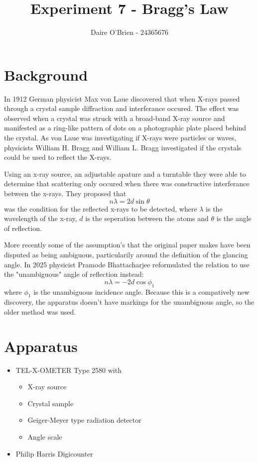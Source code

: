 \documentclass{article}
\title{Experiment 7 - Bragg's Law}
\author{Daire O'Brien - 24365676}
\begin{document}
    \maketitle
    \section{Background}
        In 1912 German physicist Max von Laue discovered that when X-rays passed through a crystal sample diffraction and interferance occured. The effect was observed when a crystal was struck with a broad-band X-ray source and manifested as a ring-like pattern of dots on a photographic plate placed behind the crystal.  As von Laue was investigating if X-rays were particles or waves, physicists William H. Bragg and William L. Bragg investigated if the crystals could be used to reflect the X-rays. \par
        Using an x-ray source, an adjustable apature and a turntable they were able to determine that scattering only occured when there was constructive interferance between the x-rays. They proposed that 
            \begin{equation}
                n \lambda = 2d \sin \theta
            \end{equation}
        was the condition for the  reflected x-rays to be detected, where $\lambda$ is the wavelength of the x-ray, $d$ is the seperation between the atoms and $\theta$ is the angle of reflection. \par
        More recently some of the assumption's that the original paper makes have been disputed as being ambiguous, particularily around the definition of the glancing angle. In 2025 physicist Pramode Bhattacharjee reformulated the relation to use the "unambiguous" angle of reflection instead:
           \[n \lambda = -2d \cos \phi_1\]
        where $\phi_1$ is the unambiguous incidence angle. Because this is a compatively new discovery, the apparatus doesn't have markings for the unambiguous angle, so the older method was used.
    \section{Apparatus}
        \begin{itemize}
            \item TEL-X-OMETER Type 2580 with \begin{itemize}
                \item X-ray source
                \item Crystal sample
                \item Geiger-Meyer type radiation detector
                \item Angle scale
            \end{itemize}
            \item Philip Harris Digicounter
        \end{itemize}
\end{document}
